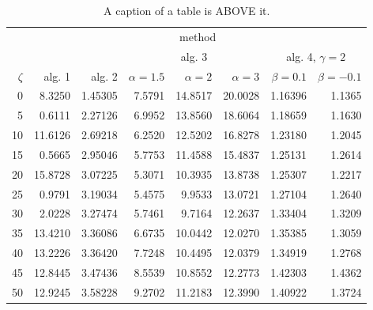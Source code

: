 \documentclass[a4paper,twoside,12pt]{book}
\begin{document}
\begin{table}
\centering
\caption{A caption of a table is ABOVE it.}
\label{tab:results}
\begin{tabular}{rrrrrrrr}
\toprule
	         &                                     \multicolumn{7}{c}{method}                                      \\
	         \cmidrule{2-8}
	         &         &         &        \multicolumn{3}{c}{alg. 3}        & \multicolumn{2}{c}{alg. 4, $\gamma = 2$} \\
	         \cmidrule(r){4-6}\cmidrule(r){7-8}
	$\zeta$ &     alg. 1 &   alg. 2 & $\alpha= 1.5$ & $\alpha= 2$ & $\alpha= 3$ &   $\beta = 0.1$  &   $\beta = -0.1$ \\
\midrule
	       0 &  8.3250 & 1.45305 &       7.5791 &    14.8517 &    20.0028 & 1.16396 &                       1.1365 \\
	       5 &  0.6111 & 2.27126 &       6.9952 &    13.8560 &    18.6064 & 1.18659 &                       1.1630 \\
	      10 & 11.6126 & 2.69218 &       6.2520 &    12.5202 &    16.8278 & 1.23180 &                       1.2045 \\
	      15 &  0.5665 & 2.95046 &       5.7753 &    11.4588 &    15.4837 & 1.25131 &                       1.2614 \\
	      20 & 15.8728 & 3.07225 &       5.3071 &    10.3935 &    13.8738 & 1.25307 &                       1.2217 \\
	      25 &  0.9791 & 3.19034 &       5.4575 &     9.9533 &    13.0721 & 1.27104 &                       1.2640 \\
	      30 &  2.0228 & 3.27474 &       5.7461 &     9.7164 &    12.2637 & 1.33404 &                       1.3209 \\
	      35 & 13.4210 & 3.36086 &       6.6735 &    10.0442 &    12.0270 & 1.35385 &                       1.3059 \\
	      40 & 13.2226 & 3.36420 &       7.7248 &    10.4495 &    12.0379 & 1.34919 &                       1.2768 \\
	      45 & 12.8445 & 3.47436 &       8.5539 &    10.8552 &    12.2773 & 1.42303 &                       1.4362 \\
	      50 & 12.9245 & 3.58228 &       9.2702 &    11.2183 &    12.3990 & 1.40922 &                       1.3724 \\
\bottomrule
\end{tabular}
\end{table}
\end{document}

